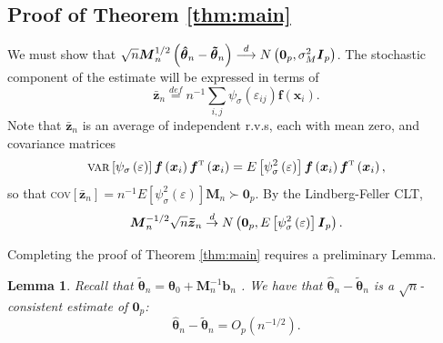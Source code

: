 \documentclass[times, authoryear, 12pt, twoside]{elsarticle}
\newtheorem{lemma}{Lemma}
\begin{document}
\medskip

\subsection{Proof of Theorem \protect\ref{thm:main}}
We must show that $\sqrt{n}\boldsymbol{M}_{n}^{1/2}\left( \boldsymbol{\hat{%
\theta}}_{n}-\boldsymbol{\tilde{\theta}}_{n}\right) \overset{d}{%
\longrightarrow }N\left( \boldsymbol{0}_{p},\sigma _{M}^{2}\boldsymbol{I}%
_{p}\right) $. The stochastic component of the estimate will be expressed in terms of 
\begin{equation}
\boldsymbol{\bar{z}}_{n}\overset{def}{=}n^{-1}\sum_{i,j}\psi _{\sigma
}\left( \varepsilon _{ij}\right) \boldsymbol{f}\left( \boldsymbol{x}%
_{i}\right) . \label{znbar}
\end{equation}
Note that $\boldsymbol{\bar{z}}_{n}$ is an average of
independent r.v.s, each with mean zero, and covariance matrices%
\begin{equation*}
\text{\textsc{var}}\left[ \psi _{\sigma }\left( \varepsilon \right) \right] 
\boldsymbol{f}\left( \boldsymbol{x}_{i}\right) \boldsymbol{f}^{{\mathrm{%
\scriptscriptstyle T}}}\left( \boldsymbol{x}_{i}\right) =E\left[ \psi
_{\sigma }^{2}\left( \varepsilon \right) \right] \boldsymbol{f}\left( 
\boldsymbol{x}_{i}\right) \boldsymbol{f}^{{\mathrm{\scriptscriptstyle T}}%
}\left( \boldsymbol{x}_{i}\right) ,
\end{equation*}%
so that \textsc{cov}$\left[ \boldsymbol{\bar{z}}_{n}\right] =n^{-1}E\left[
\psi _{\sigma }^{2}\left( \varepsilon \right) \right] \boldsymbol{M}%
_{n}\succ \boldsymbol{0}_{p}$. By the Lindberg-Feller CLT, 
\begin{equation}
\boldsymbol{M}_{n}^{-1/2}\sqrt{n}\boldsymbol{\bar{z}}_{n}\overset{d}{%
\rightarrow }N\left( \boldsymbol{0}_{p},E\left[ \psi _{\sigma }^{2}\left(
\varepsilon \right) \right] \boldsymbol{I}_{p}\right) .  \label{AN-z}
\end{equation}

Completing the proof of Theorem \ref{thm:main} requires a preliminary Lemma. 

\begin{lemma}
\label{root-n consistent} Recall that $\boldsymbol{\tilde{\theta}}_{n}=%
\boldsymbol{\theta }_{0}+\boldsymbol{M}_{n}^{-1}\boldsymbol{b}_{n}$ . We
have that $\boldsymbol{\hat{\theta}}_{n}-\boldsymbol{\tilde{\theta}}_{n}$ is
a $\sqrt{n}$-consistent estimate of $\boldsymbol{0}_{p}$:    
\begin{equation}
\boldsymbol{\hat{\theta}}_{n}-\boldsymbol{\tilde{\theta}}_{n}=O_{p}\left(
n^{-1/2}\right) .  \label{claim2}
\end{equation}
\end{lemma}
\end{document}
